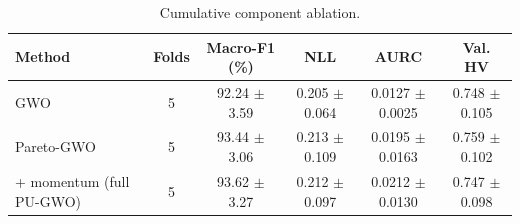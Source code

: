\begin{table}[t]
\centering
\caption{Cumulative component ablation.}
\label{tab:table6_cumulative_ablation}
\small
\begin{tabular}{lccccc}
\toprule
Method & Folds & Macro-F1 (\%) & NLL & AURC & Val. HV \\
\midrule
GWO & 5 & 92.24 $\pm$ 3.59 & 0.205 $\pm$ 0.064 & 0.0127 $\pm$ 0.0025 & 0.748 $\pm$ 0.105 \\
Pareto-GWO & 5 & 93.44 $\pm$ 3.06 & 0.213 $\pm$ 0.109 & 0.0195 $\pm$ 0.0163 & 0.759 $\pm$ 0.102 \\
+ momentum (full PU-GWO) & 5 & 93.62 $\pm$ 3.27 & 0.212 $\pm$ 0.097 & 0.0212 $\pm$ 0.0130 & 0.747 $\pm$ 0.098 \\
\bottomrule
\end{tabular}
\end{table}
